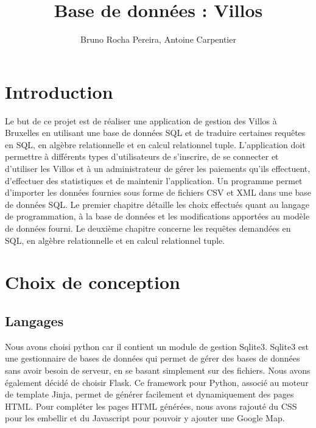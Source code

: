 \documentclass[a4paper,11pt]{report}
\author{Bruno Rocha Pereira, Antoine Carpentier}
\title{Base de données : Villos}
\begin{document}

\maketitle

\chapter{Introduction}

Le but de ce projet est de réaliser une application de gestion des Villos à Bruxelles en utilisant une base de données SQL et de traduire certaines requêtes en SQL, en algèbre relationnelle et en calcul relationnel tuple.
L'application doit permettre à différents types d'utilisateurs de s'inscrire, de se connecter et d'utiliser les Villos et à un administrateur de gérer les paiements qu'ils effectuent, d'effectuer des statistiques et de maintenir l'application.
Un programme permet d'importer les données fournies sous forme de fichiers CSV et XML dans une base de données SQL.
Le premier chapitre détaille les choix effectués quant au langage de programmation, à la base de données et les modifications apportées au modèle de données fourni.
Le deuxième chapitre concerne les requêtes demandées en SQL, en algèbre relationnelle et en calcul relationnel tuple.

\chapter{Choix de conception}

\section{Langages}

Nous avons choisi python car il contient un module de gestion Sqlite3. Sqlite3 est une gestionnaire de bases de données qui permet de gérer des bases de données sans avoir besoin de serveur, en se basant simplement sur des fichiers.
Nous avons également décidé de choisir Flask. Ce framework pour Python, associé au moteur de template Jinja, permet de générer facilement et dynamiquement des pages HTML. Pour compléter les pages HTML générées, nous avons rajouté du CSS pour les embellir et du Javascript pour pouvoir y ajouter une Google Map.
\end{document}
